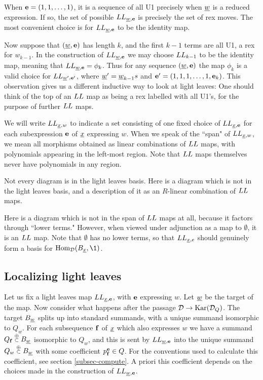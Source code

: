 \begin{remark} \label{LLof111} When ${\mathbf e}=(1,1,\ldots,1)$, it is a sequence of all U1 precisely when ${\underline{w}}$ is a reduced expression. If so, the set of possible $LL_{{\underline{w}},{\mathbf e}}$ is precisely
the set of rex moves. The most convenient choice is for $LL_{{\underline{w}},{\mathbf e}}$ to be the identity map.

Now suppose that $({\underline{w}},{\mathbf e})$ has length $k$, and the first $k-1$ terms are all U1, a rex for $w_{k-1}$. In the construction of $LL_{{\underline{w}},{\mathbf e}}$ we may choose $LL_{k-1}$ to be the identity
map, meaning that $LL_{{\underline{w}},{\mathbf e}} = \phi_k$. Thus for any sequence $({\underline{w}},{\mathbf e})$ the map $\phi_k$ is a valid choice for $LL_{{\underline{w}}',{\mathbf e}'}$, where ${\underline{w}}' = {\underline{w}}_{k-1} s$ and ${\mathbf e}' =
(1,1,1,\ldots,1,{\mathbf e}_k)$. This observation gives us a different inductive way to look at light leaves:  One should think of the top of an $LL$ map as being a rex
labelled with all U1's, for the purpose of further $LL$ maps. \end{remark}

We will write $LL_{{\underline{x}},w}$ to indicate a set consisting of one fixed choice of $LL_{{\underline{x}},{\mathbf e}}$ for each subexpression ${\mathbf e}$ of $\underline{x}$ expressing $w$. When we speak of the ``span" of  $LL_{{\underline{x}},w}$, we mean all morphisms obtained as linear combinations of $LL$ maps, with polynomials appearing in the left-most region. Note that $LL$ maps themselves never have polynomials in any region.

\begin{remark} Not every diagram is in the light leaves basis. Here is a diagram which is not in the light leaves basis, and a description of it as an $R$-linear combination of $LL$ maps.

Here is a diagram which is not in the span of $LL$ maps at all, because it factors through ``lower terms."
However, when viewed under adjunction as a map to $\emptyset$, it is an $LL$ map.
Note that $\emptyset$ has no lower terms, so that $LL_{{\underline{x}},e}$ should genuinely form a basis for
$\Hom_{\DC}(B_{\un{x}},\1)$.
\end{remark}

\subsection{Localizing light leaves}

Let us fix a light leaves map $LL_{{\underline{x}},{\mathbf e}}$, with ${\mathbf e}$ expressing $w$. Let ${\underline{w}}$ be the target of the map. Now consider what happens after the passage ${\mathcal{D}} \rightarrow \textrm{Kar}({\mathcal{D}}_Q)$. The target $B_{\underline{w}}$ splits up into standard summands, with a unique summand isomorphic to $Q_w$. For each subsequence ${\mathbf f}$ of ${\underline{x}}$ which also expresses $w$ we have a summand $Q_{\mathbf f} \stackrel{\scriptstyle{\oplus}}{\scriptstyle{\subset}} B_{\underline{w}}$ isomorphic to $Q_w$, and this is sent by $LL_{{\underline{w}},{\mathbf e}}$ into the unique summand $Q_w \stackrel{\scriptstyle{\oplus}}{\scriptstyle{\subset}} B_{\underline{w}}$ with some coefficient $p^{\mathbf e}_{\mathbf f} \in Q$. For the conventions used to calculate this coefficient, see section \ref{subsec-compute}. A priori this coefficient depends on the choices made in the construction of $LL_{{\underline{w}},{\mathbf e}}$.

